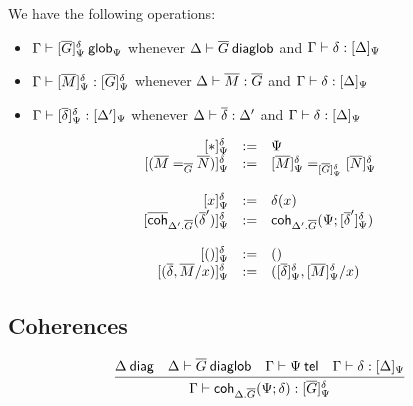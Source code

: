 We have the following operations:
\begin{itemize}
\item ${\Gamma} \vdash {[{\ensuremath{\overline{G}}}]_{\Psi}^{\delta}} \: \mathsf{glob}_{\Psi}$ whenever
  ${\Delta} \vdash {\ensuremath{\overline{G}}} \: \mathsf{diaglob}$ and ${\Gamma} \vdash {\delta} : {[ \Delta ]_{\Psi}}$
\item ${\Gamma} \vdash {[{\ensuremath{\overline{M}}}]_{\Psi}^{\delta}} : {} {[{\overline{G}}]_{\Psi}^{\delta}}$ whenever ${\Delta} \vdash {\ensuremath{\overline{M}}} : {\overline{G}}$ and
  ${\Gamma} \vdash {\delta} : {[ \Delta ]_{\Psi}}$
\item ${\Gamma} \vdash {[{\ensuremath{\overline{\delta}}}]_{\Psi}^{\delta}} : {[ \Delta' ]_{\Psi}}$
  whenever ${\Delta} \vdash {\ensuremath{\overline{\delta}}} : {\Delta'}$ and
  ${\Gamma} \vdash {\delta} : {[ \Delta ]_{\Psi}}$
\end{itemize}

\begin{small}
  \[
  \begin{array}{rcl}
    \interpglob{\diagbase}{\Psi}{\delta} & := & \Psi \\
    \interpglob{(\homj{\diag G}{\diag M}{\diag N})}{\Psi}{\delta} & := &
    \homj{\interpglob{\diag G}{\Psi}{\delta}}{\interpglob{\diag M}{\Psi}{\delta}}
    {\interpglob{\diag N}{\Psi}{\delta}}\\\\

    \interpglob{x}{\Psi}{\delta} & := & \delta(x) \\
    \interpglob{\diagcoh{\Delta'.\diag{G}}{\diag \delta'}}{\Psi}{\delta} & := &
    \coh{\Delta'.\diag G}{\Psi}{\interpglob{\diag\delta'}{\Psi}{\delta}}\\\\

    \interpglob{()}{\Psi}{\delta} & := & () \\
    \interpglob{(\diag \delta,\diag M/x)}{\Psi}{\delta} & := &
    (\interpglob{\diag\delta}{\Psi}{\delta},\interpglob{\diag
    M}{\Psi}{\delta}/x)
  \end{array}
  \]
\end{small}

\subsection{Coherences}

\begin{small}
  \[
  \infer{\ofglob{\Gamma}{\coh{{\Delta}.\diag{G}}{\Psi}{\delta}}
    {\interpglob{\diag{G}}{\Psi}{\delta}}}
  {\wfdiag{\Delta}
    & \wfdiaglob{\Delta}{\diag G}
    & \wftel{\Gamma}{\Psi}
    & \ofinterp{\Gamma}{\delta}{\Delta}{\Psi}}
  \]
\end{small}

